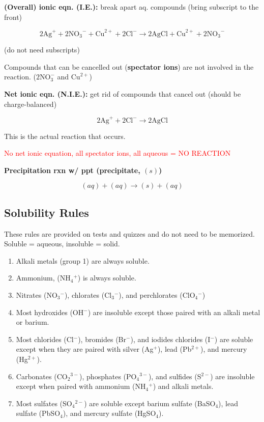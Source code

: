 \documentclass[a4paper, 12pt]{article}
\begin{document}
\textbf{(Overall) ionic eqn. (I.E.):} break apart aq. compounds (bring subscript to the front)

$$2\text{Ag}^+ + 2{\text{NO}_3}^- + \text{Cu}^{2+} + 2\text{Cl}^- \longrightarrow 2\text{AgCl} + \text{Cu}^{2+} + {2\text{NO}_3}^-$$

(do not need subscripts)

Compounds that can be cancelled out (\textbf{spectator ions}) are not involved in the reaction. ($2\text{NO}_3^-$ and $\text{Cu}^{2+}$)

\textbf{Net ionic eqn. (N.I.E.):} get rid of compounds that cancel out (should be charge-balanced)

$$2\text{Ag}^+ + 2\text{Cl}^- \longrightarrow 2\text{AgCl}$$

This is the actual reaction that occurs.

\textcolor{red}{No net ionic equation, all spectator ions, all aqueous = NO REACTION}

\textbf{Precipitation rxn w/ ppt (precipitate, $(s)$)}

$$(aq) + (aq) \longrightarrow (s) + (aq)$$

\subsection{Solubility Rules} \label{solubility rules}
These rules are provided on tests and quizzes and do not need to be memorized. Soluble = aqueous, insoluble = solid.

\begin{enumerate}[leftmargin=*, nosep]
    \item Alkali metals (group 1) are always soluble.
    \item Ammonium, (NH$_4$$^+$) is always soluble.
    \item Nitrates (NO$_3$$^-$), chlorates (Cl$_3$$^-$), and perchlorates (ClO$_4$$^-$)
    \item Most hydroxides (OH$^-$) are insoluble except those paired with an alkali metal or barium.
    \item Most chlorides (Cl$^-$), bromides (Br$^-$), and iodides chlorides (I$^-$) are soluble except when they are paired with silver (Ag$^+$), lead (Pb$^{2+}$), and mercury (Hg$^{2+}$).
    \item Carbonates (CO$_2$$^{3-}$), phosphates (PO$_4$$^{3-}$), and sulfides (S$^{2-}$) are insoluble except when paired with ammonium (NH$_4$$^+$) and alkali metals.
    \item Most sulfates (SO$_4$$^{2-}$) are soluble except barium sulfate (BaSO$_4$), lead sulfate (PbSO$_4$), and mercury sulfate (HgSO$_4$).
\end{enumerate}
\end{document}
